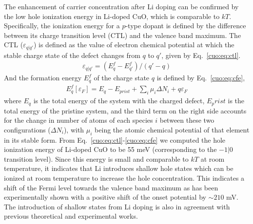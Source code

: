 The enhancement of carrier concentration after Li doping can be confirmed by the low hole ionization energy in Li-doped CuO, which is comparable to $kT$. Specifically, the ionization energy for a $p$-type dopant is defined by the difference between its charge transition level (CTL) and the valence band maximum. The CTL ($\varepsilon_{q|q'}$) is defined as the value of electron chemical potential at which the stable charge state of the defect changes from $q$ to $q'$, given by Eq.~\ref{cuo:eq:ctl}.
\begin{align}
    \varepsilon_{q|q'} = \left( E_q^f - E_{q'}^f \right) / (q' - q)
    \label{cuo:eq:ctl}
\end{align}
And the formation energy $E_q^f$ of the charge state $q$ is defined by Eq.~\ref{cuo:eq:cfe},
\begin{align}
    E_q^f [\varepsilon_F ]=E_q-E_{prist}+\sum_i \mu_i \Delta N_i +q\varepsilon_F
    \label{cuo:eq:cfe}
\end{align}
where $E_q$ is the total energy of the system with the charged defect, $E_prist$ is the total energy of the pristine system, and the third term on the right side accounts for the change in number of atoms of each species $i$ between these two configurations ($\Delta N_i$), with $\mu_i$ being the atomic chemical potential of that element in its stable form. From Eq.~\ref{cuo:eq:ctl}-\ref{cuo:eq:cfe} we computed the hole ionization energy of Li-doped CuO to be 55 meV (corresponding to the $-1|0$ transition level). Since this energy is small and comparable to $kT$ at room temperature, it indicates that Li introduces shallow hole states which can be ionized at room temperature to increase the hole concentration. This indicates a shift of the Fermi level towards the valence band maximum as has been experimentally shown with a positive shift of the onset potential by $\sim 210$ mV. The introduction of shallow states from Li doping is also in agreement with previous theoretical and experimental works.\cite{zheng2004fast,choi2017p}

